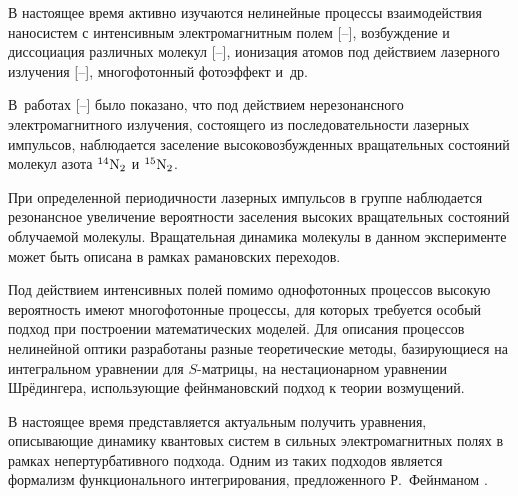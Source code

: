 \date{19/XII/2014} %








\makerutitle








В настоящее время активно изучаются нелинейные процессы взаимодействия наносистем с интенсивным  электромагнитным полем [--], возбуждение и диссоциация различных молекул [--], ионизация атомов под действием лазерного излучения [--], многофотонный фотоэффект \cite{biruk:Raynaud, biruk:Raynaud2} и~др. 

В~работах [--] было показано, что под действием нерезонансного электромагнитного излучения, состоящего из последовательности лазерных импульсов, наблюдается  заселение высоковозбужденных вращательных состояний молекул азота $^{14}\rm N_2$ и $^{15}\rm N_2$. 

При определенной периодичности лазерных импульсов в группе наблюдается резонансное увеличение вероятности заселения высоких вращательных состояний облучаемой молекулы. Вращательная динамика молекулы в данном эксперименте может быть описана в рамках рамановских переходов.



Под действием интенсивных полей помимо однофотонных процессов высокую вероятность имеют многофотонные процессы, для которых требуется особый подход при построении математических моделей. Для описания процессов нелинейной оптики разработаны разные теоретические методы, базирующиеся на интегральном уравнении для $S$-матрицы, на нестационарном уравнении Шрёдингера, использующие фейнмановский подход к теории возмущений.



В настоящее время представляется актуальным получить уравнения, описывающие динамику квантовых систем в сильных электромагнитных полях в рамках непертурбативного подхода. Одним из таких подходов является формализм функционального интегрирования, предложенного Р.~Фейнманом \cite{biruk:Feynman_Path}. 



